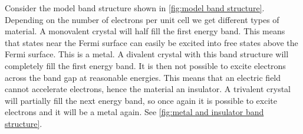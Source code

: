 \documentclass[fleqn]{NotesClass}
\begin{document}
    Consider the model band structure shown in \cref{fig:model band structure}.
    Depending on the number of electrons per unit cell we get different types of material.
    A monovalent crystal will half fill the first energy band.
    This means that states near the Fermi surface can easily be excited into free states above the Fermi surface.
    This is a metal.
    A divalent crystal with this band structure will completely fill the first energy band.
    It is then not possible to excite electrons across the band gap at reasonable energies.
    This means that an electric field cannot accelerate electrons, hence the material an insulator.
    A trivalent crystal will partially fill the next energy band, so once again it is possible to excite electrons and it will be a metal again.
    See \cref{fig:metal and insulator band structure}.
    
\end{document}
